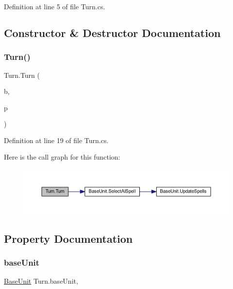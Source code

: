 Definition at line 5 of file Turn.\+cs.



\subsection{Constructor \& Destructor Documentation}
\mbox{\label{class_turn_a6446f2b617305c390dce97e1c7242066}} 
\subsubsection{\texorpdfstring{Turn()}{Turn()}}
{\footnotesize\ttfamily Turn.\+Turn (\begin{DoxyParamCaption}\item[{\mbox{\hyperlink{class_base_unit}{Base\+Unit}}}]{b,  }\item[{int}]{p }\end{DoxyParamCaption})}



Definition at line 19 of file Turn.\+cs.

Here is the call graph for this function\+:
\nopagebreak
\begin{figure}[H]
\begin{center}
\leavevmode
\includegraphics[width=350pt]{class_turn_a6446f2b617305c390dce97e1c7242066_cgraph}
\end{center}
\end{figure}


\subsection{Property Documentation}
\mbox{\label{class_turn_a59d549b1393677617e4237dcab3e27f9}} 
\subsubsection{\texorpdfstring{baseUnit}{baseUnit}}
{\footnotesize\ttfamily \mbox{\hyperlink{class_base_unit}{Base\+Unit}} Turn.\+base\+Unit\hspace{0.3cm}{\ttfamily [get]}, {\ttfamily [set]}}



